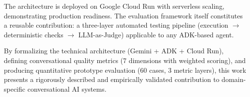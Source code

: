 \documentclass[10pt,twocolumn,a4paper]{article}
\begin{document}
The architecture is deployed on Google Cloud Run with serverless scaling, demonstrating production readiness. The evaluation framework itself constitutes a reusable contribution: a three-layer automated testing pipeline (execution $\rightarrow$ deterministic checks $\rightarrow$ LLM-as-Judge) applicable to any ADK-based agent.

By formalizing the technical architecture (Gemini + ADK + Cloud Run), defining conversational quality metrics (7 dimensions with weighted scoring), and producing quantitative prototype evaluation (60 cases, 3 metric layers), this work presents a rigorously described and empirically validated contribution to domain-specific conversational AI systems.


\end{document}
